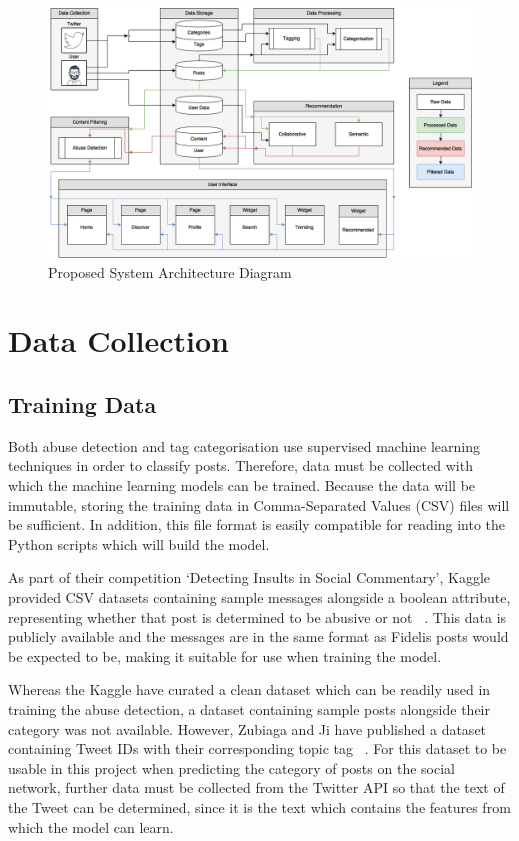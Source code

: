 \begin{figure}[H]
  \centering
  \includegraphics[width=1.0\textwidth]{Images/Design/SystemArchitecture}
  \caption{Proposed System Architecture Diagram} \label{fig:SystemArchitecture} 
\end{figure}

\section{Data Collection}

\subsection{Training Data}
Both abuse detection and tag categorisation use supervised machine learning techniques in order to classify posts.  Therefore, data must be collected with which the machine learning models can be trained. Because the data will be immutable, storing the training data in Comma-Separated Values (CSV) files will be sufficient. In addition, this file format is easily compatible for reading into the Python scripts which will build the model.

As part of their competition `Detecting Insults in Social Commentary', Kaggle provided CSV datasets containing sample messages alongside a boolean attribute, representing whether that post is determined to be abusive or not ~\cite{Kaggle:Dataset}. This data is publicly available and the messages are in the same format as Fidelis posts would be expected to be, making it suitable for use when training the model.

Whereas the Kaggle have curated a clean dataset which can be readily used in training the abuse detection, a dataset containing sample posts alongside their category was not available. However, Zubiaga and Ji have published a dataset containing Tweet IDs with their corresponding topic tag ~\cite{Zubiaga:Tweets}. For this dataset to be usable in this project when predicting the category of posts on the social network, further data must be collected from the Twitter API so that the text of the Tweet can be determined, since it is the text which contains the features from which the model can learn.

